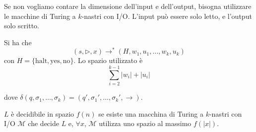 Se non vogliamo contare la dimensione dell'input e dell'output, bisogna utilizzare le macchine di Turing a $k$-nastri con I/O. L'input può essere solo letto, e l'output solo scritto.

\begin{definition}
    Si ha che
    $$
        (s,\rhd,x) \to^* (H,w_1,u_1,\dots,w_k,u_k)
    $$
    con $H=\{\text{halt},\text{yes},\text{no}\}$. Lo spazio utilizzato è
    $$
        \sum_{i=2}^{k-1} |w_i| + |u_i|
    $$
\end{definition}
dove $\delta(q,\sigma_1,\dots,\sigma_k)=(q',\sigma_1',\dots,\sigma_k',\to)$.

\begin{definition}
    $L$ è decidibile in spazio $f(n)$ se esiste una macchina di Turing a $k$-nastri con I/O $\mathcal{M}$ che decide $L$ e, $\forall x$, $\mathcal{M}$ utilizza uno spazio al massimo $f(|x|)$.
\end{definition}

